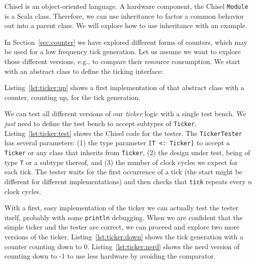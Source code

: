 \documentclass[%
    10pt,
    headinclude, footexclude,
    openright, %
    notitlepage,
    cleardoubleempty,
    headsepline,
    pointlessnumbers,
    bibtotoc, idxtotoc,
    ]{scrbook}
\newcommand{\code}[1]{{\small{\texttt{#1}}}}
\begin{document}
Chisel is an object-oriented language. A hardware component, the Chisel \code{Module}
is a Scala class. Therefore, we can use inheritance to factor a common behavior
out into a parent class. We will explore how to use inheritance with an example.

In Section~\ref{sec:counter} we have explored different forms of counters,
which may be used for a low frequency tick generation. Let us assume we want to
explore those different versions, e.g., to compare their resource consumption.
We start with an abstract class to define the ticking interface:


\noindent Listing~\ref{lst:ticker:up} shows a first implementation of that abstract class
with a counter, counting up, for the tick generation.


We can test all different versions of our \emph{ticker} logic with a single test bench.
We \emph{just} need to define the test bench to accept subtypes of \code{Ticker}.
Listing~\ref{lst:ticker:test} shows the Chisel code for the tester.
The \code{TickerTester} has several parameters: (1) the type parameter
\code{[T <: Ticker]} to accept a \code{Ticker} or any class that inherits from \code{Ticker},
(2) the design under test, being of type \code{T} or a subtype thereof,
and (3) the number of clock cycles we expect for each tick.
The tester waits for the first occurrence of a tick (the start might be different for
different implementations) and then checks that \code{tick} repeats every $n$ clock cycles.


With a first, easy implementation of the ticker we can actually test the tester
itself, probably with some \code{println} debugging. When we are confident that
the simple ticker and the tester are correct, we can proceed and explore
two more versions of the ticker. Listing~\ref{lst:ticker:down} shows the tick
generation with a counter counting down to 0.
Listing~\ref{lst:ticker:nerd} shows the nerd version of counting down to -1 to use
less hardware by avoiding the comparator.


\end{document}

